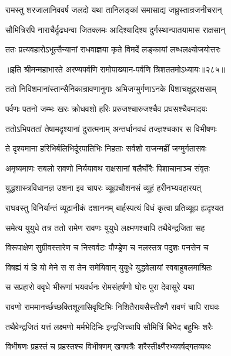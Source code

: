 \twolineshloka
{रामस्तु शरजालानिववर्ष जलदो यथा}
{तानिलङ्कां समासाद्य जघ्रुस्तान्रजनीचरान्}


\twolineshloka
{सौमित्रिरपि नाराचैर्दृढधन्वा जितक्लमः}
{आदिश्यादिश्य दुर्गस्थान्पातयामास राक्षसान्}


\twolineshloka
{ततः प्रत्यवहारोऽभूत्सैन्यानां राधवाज्ञया}
{कृते विमर्दे लङ्कायां लब्धलक्ष्योजयोत्तरः}


॥इति श्रीमन्महाभारते अरण्यपर्वणि रामोपाख्यान-पर्वणि त्रिशततमोऽध्यायः॥२८५॥

\storymeta

\resetShloka



\twolineshloka
{ततो निविशमानांस्तान्सैनिकान्रावणानुगाः}
{अभिजग्मुर्गणाऽनके पिशाचक्षुद्ररक्षसाम्}


\twolineshloka
{पर्वणः पतनो जम्भः खरः क्रोधवशो हरिः}
{प्ररुजश्चारुजश्चैव प्रघसश्चैवमादयः}


\twolineshloka
{ततोऽभिपततां तेषामदृश्यानां दुरात्मनाम्}
{अन्तर्धानवधं तज्ज्ञश्चकार स विभीषणः}


\twolineshloka
{ते दृश्यमाना हरिभिर्बलिभिर्दूरपातिभिः}
{निहताः सर्वशो राजन्महीं जग्मुर्गतासवः}


\twolineshloka
{अमृष्यमाणः सबलो रावणो निर्ययावथ}
{राक्षसानां बलैर्घोरैः पिशाचानाञ्च संवृतः}


\twolineshloka
{युद्धशास्त्रविधानज्ञ उशना इव चापरः}
{व्यूह्यचौशनसं व्यूहं हरीनभ्यवहारयत्}


\twolineshloka
{राघवस्तु विनिर्यान्तं व्यूढानीकं दशाननम्}
{बार्हस्पत्यं विधं कृत्वा प्रतिव्यूह्य ह्यदृश्यत}


\twolineshloka
{समेत्य युयुधे तत्र ततो रामेण रावणः}
{युयुधे लक्ष्मणश्चापि तथैवेन्द्रजिता सह}


\twolineshloka
{विरूपाक्षेण सुग्रीवस्तारेण च निस्वर्वटः}
{पौण्ड्रेण च नलस्तत्र पदुशः पनसेन च}


\twolineshloka
{विषह्यं यं हि यो मेने स स तेन समेयिवान्}
{युयुधे युद्धवेलायां स्वबाहुबलमाश्रितः}


\twolineshloka
{स सप्रहारो ववृधे भीरूणां भयवर्धनः}
{रोमसंहर्षणो घोरः पुरा देवासुरे यथा}


\twolineshloka
{रावणो राममानर्च्छच्छक्तिशूलासिवृष्टिभिः}
{निशितैरायसैस्तीक्ष्णै रावणं चापि राघवः}


\twolineshloka
{तथैवेन्द्रजितं यत्तं लक्ष्मणो मर्मभेदिभिः}
{इन्द्रजिच्चापि सौमित्रिं बिभेद बहुभिः शरैः}


\twolineshloka
{विभीषणः प्रहस्तं च प्रहस्तश्च विभीषणम्}
{खगपत्रैः शरैस्तीक्ष्णैरभ्यवर्षद्गतव्यथः}


